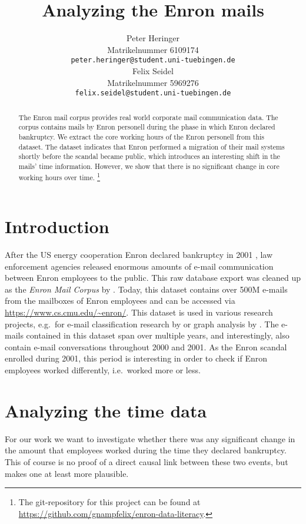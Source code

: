 \documentclass{article}
\title{Analyzing the Enron mails}
\author{%
  Peter Heringer\\
  Matrikelnummer 6109174 \\
  \texttt{peter.heringer@student.uni-tuebingen.de} \\
  \And Felix Seidel\\
  Matrikelnummer 5969276 \\
  \texttt{felix.seidel@student.uni-tuebingen.de} \\
}
\begin{document}
\maketitle

\begin{abstract}
  The Enron mail corpus provides real world corporate mail communication data.
  The corpus contains mails by Enron personell during the phase in which Enron
  declared bankruptcy. We extract the core working hours of the Enron personell
  from this dataset. The dataset indicates that Enron performed a migration of
  their mail systems shortly before the scandal became public, which introduces
  an interesting shift in the mails' time information. However, we show that
  there is no significant change in core working hours over time. \footnote{The
  git-repository for this project can be found at
  \url{https://github.com/gnampfelix/enron-data-literacy}.} 
\end{abstract}

\section{Introduction}
After the US energy cooperation Enron declared bankruptcy in 2001
\citep{10.1257/089533003765888403}, law enforcement agencies released enormous
amounts of e-mail communication between Enron employees to the public. This raw
database export was cleaned up as the \emph{Enron Mail Corpus} by
\citet{Klimt2004IntroducingTE}. Today, this dataset contains over 500M e-mails
from the mailboxes of Enron employees and can be accessed via
\url{https://www.cs.cmu.edu/~enron/}. This dataset is used in various research
projects, e.g.~for e-mail classification research by
\citet{10.1007/978-3-540-30115-8_22} or graph analysis by
\citet{Chapanond_2005}. The e-mails contained in this dataset span over multiple
years, and interestingly, also contain e-mail conversations throughout 2000 and
2001. As the Enron scandal enrolled during 2001, this period is interesting in
order to check if Enron employees worked differently, i.e.~worked more or less.

\section{Analyzing the time data}
For our work we want to investigate whether there was any significant change in
the amount that employees worked during the time they declared bankruptcy.
This of course is no proof of a direct causal link between these two events, but
makes one at least more plausible.
\end{document}
